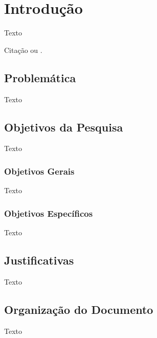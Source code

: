 \chapter{Introdução}

Texto

Citação \cite{Nascimento2014} ou .

\section{Problemática}

Texto

\section{Objetivos da Pesquisa}

Texto

\subsection{Objetivos Gerais}

Texto

\subsection{Objetivos Específicos}

Texto

\section{Justificativas}

Texto

\section{Organização do Documento}

Texto
